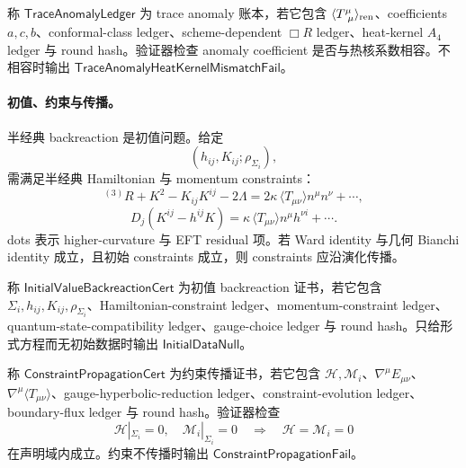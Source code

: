 \begin{definition}\label{def:typed-address-biaxial-completion-trace-anomaly-ledger}
称 \(\mathsf{TraceAnomalyLedger}\) 为 trace anomaly 账本，若它包含 \(\langle T^\mu_{\ \mu}\rangle_{\rm ren}\)、coefficients \(a,c,b\)、conformal-class ledger、scheme-dependent \(\Box R\) ledger、heat-kernel \(A_4\) ledger 与 round hash。验证器检查 anomaly coefficient 是否与热核系数相容。不相容时输出 \(\mathsf{TraceAnomalyHeatKernelMismatchFail}\)。
\end{definition}

\paragraph{初值、约束与传播。}
半经典 backreaction 是初值问题。给定
\[
(h_{ij},K_{ij};\rho_{\Sigma_i}),
\]
需满足半经典 Hamiltonian 与 momentum constraints：
\[
{}^{(3)}R+K^2-K_{ij}K^{ij}-2\Lambda
=
2\kappa\,\langle T_{\mu\nu}\rangle n^\mu n^\nu+\cdots,
\]
\[
D_j(K^{ij}-h^{ij}K)
=
\kappa\,\langle T_{\mu\nu}\rangle n^\mu h^{\nu i}+\cdots.
\]
dots 表示 higher-curvature 与 EFT residual 项。若 Ward identity 与几何 Bianchi identity 成立，且初始 constraints 成立，则 constraints 应沿演化传播。

\begin{definition}[初值 backreaction 证书]\label{def:typed-address-biaxial-completion-initial-value-backreaction-cert}
称 \(\mathsf{InitialValueBackreactionCert}\) 为初值 backreaction 证书，若它包含 \(\Sigma_i,h_{ij},K_{ij},\rho_{\Sigma_i}\)、Hamiltonian-constraint ledger、momentum-constraint ledger、quantum-state-compatibility ledger、gauge-choice ledger 与 round hash。只给形式方程而无初始数据时输出 \(\mathsf{InitialDataNull}\)。
\end{definition}

\begin{definition}[约束传播证书]\label{def:typed-address-biaxial-completion-constraint-propagation-cert}
称 \(\mathsf{ConstraintPropagationCert}\) 为约束传播证书，若它包含 \(\mathcal H,\mathcal M_i\)、\(\nabla^\mu E_{\mu\nu}\)、\(\nabla^\mu\langle T_{\mu\nu}\rangle\)、gauge-hyperbolic-reduction ledger、constraint-evolution ledger、boundary-flux ledger 与 round hash。验证器检查
\[
\mathcal H|_{\Sigma_i}=0,\quad
\mathcal M_i|_{\Sigma_i}=0
\quad\Longrightarrow\quad
\mathcal H=\mathcal M_i=0
\]
在声明域内成立。约束不传播时输出 \(\mathsf{ConstraintPropagationFail}\)。
\end{definition}


